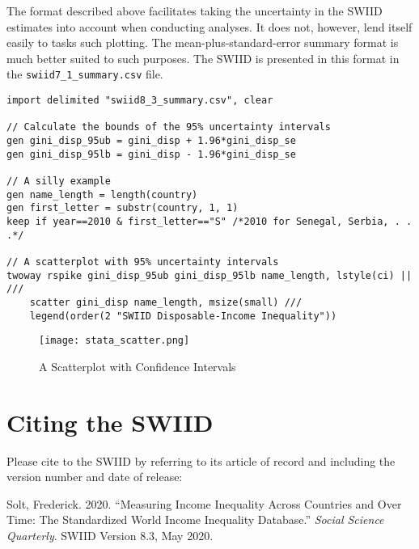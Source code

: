 \documentclass[11pt]{article}
\begin{document}
The format described above facilitates taking the uncertainty in the
SWIID estimates into account when conducting analyses. It does not,
however, lend itself easily to tasks such plotting. The
mean-plus-standard-error summary format is much better suited to such
purposes. The SWIID is presented in this format in the
\texttt{swiid7\_1\_summary.csv} file.


\begin{verbatim}
import delimited "swiid8_3_summary.csv", clear
 
// Calculate the bounds of the 95% uncertainty intervals
gen gini_disp_95ub = gini_disp + 1.96*gini_disp_se
gen gini_disp_95lb = gini_disp - 1.96*gini_disp_se

// A silly example
gen name_length = length(country)
gen first_letter = substr(country, 1, 1)
keep if year==2010 & first_letter=="S" /*2010 for Senegal, Serbia, . . .*/

// A scatterplot with 95% uncertainty intervals
twoway rspike gini_disp_95ub gini_disp_95lb name_length, lstyle(ci) || ///
    scatter gini_disp name_length, msize(small) ///
    legend(order(2 "SWIID Disposable-Income Inequality")) 
\end{verbatim}

\begin{figure}[htbp] 
	\caption{A Scatterplot with Confidence Intervals}
	\label{F:scatter}
	\texttt{[image: stata\_scatter.png]}
\end{figure}

\pagebreak
\section{Citing the SWIID}

Please cite to the SWIID by referring to its article of record and including the version number and date of release:\\

\begin{hangparas}{.25in}{1}
Solt, Frederick. 2020. ``Measuring Income Inequality Across Countries and Over Time: The Standardized World Income Inequality Database.'' \emph{Social Science Quarterly}.  SWIID Version 8.3, May 2020.
\end{hangparas}




\pagebreak
\end{document}
